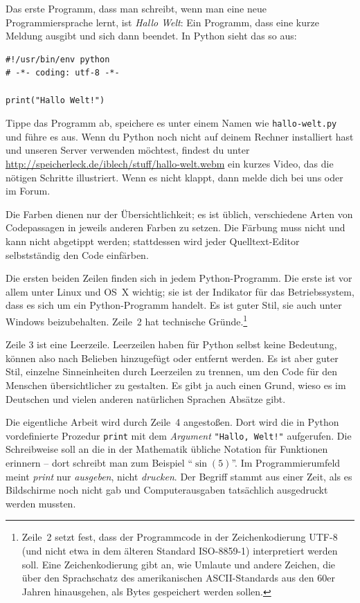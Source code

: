 \documentclass{blatt}
\begin{document}
Das erste Programm, dass man schreibt, wenn man eine neue Programmiersprache
lernt, ist \emph{Hallo Welt}: Ein Programm, dass eine kurze Meldung ausgibt
und sich dann beendet. In Python sieht das so aus:

\begin{verbatim}
#!/usr/bin/env python
# -*- coding: utf-8 -*-

print("Hallo Welt!")
\end{verbatim}

Tippe das Programm ab, speichere es unter
einem Namen wie \texttt{hallo-welt.py} und führe es aus. Wenn du Python noch
nicht auf deinem Rechner installiert hast und unseren Server verwenden
möchtest, findest du unter
\url{http://speicherleck.de/iblech/stuff/hallo-welt.webm} ein kurzes Video, das
die nötigen Schritte illustriert. Wenn es nicht klappt, dann melde dich bei uns
oder im Forum.

Die Farben dienen nur der Übersichtlichkeit; es ist üblich, verschiedene Arten
von Codepassagen in jeweils anderen Farben zu setzen. Die Färbung muss nicht
und kann nicht abgetippt werden; stattdessen wird jeder Quelltext-Editor
selbstständig den Code einfärben.

Die ersten beiden Zeilen finden sich in jedem Python-Programm. Die erste ist
vor allem unter Linux und OS~X wichtig; sie ist der Indikator für das
Betriebssystem, dass es sich um ein Python-Programm handelt. Es ist guter Stil,
sie auch unter Windows beizubehalten. Zeile~2 hat technische
Gründe.\footnote{Zeile~2 setzt fest, dass der Programmcode in der
Zeichenkodierung UTF-8 (und nicht etwa in dem älteren Standard ISO-8859-1)
interpretiert werden soll. Eine Zeichenkodierung gibt an, wie Umlaute und
andere Zeichen, die über den Sprachschatz des amerikanischen ASCII-Standards
aus den 60er Jahren hinausgehen, als Bytes gespeichert werden sollen.}

Zeile 3 ist eine Leerzeile. Leerzeilen haben für Python selbst keine Bedeutung,
können also nach Belieben hinzugefügt oder entfernt werden. Es ist aber guter
Stil, einzelne Sinneinheiten durch Leerzeilen zu trennen, um den Code für den
Menschen übersichtlicher zu gestalten. Es gibt ja auch einen Grund, wieso es im
Deutschen und vielen anderen natürlichen Sprachen Absätze gibt.

Die eigentliche Arbeit wird durch Zeile~4 angestoßen. Dort wird die in Python
vordefinierte Prozedur \texttt{print} mit dem \emph{Argument}
\texttt{"Hallo, Welt!"} aufgerufen. Die Schreibweise soll an die in der Mathematik übliche
Notation für Funktionen erinnern -- dort schreibt man zum Beispiel
"`$\sin(5)$"'. Im Programmierumfeld meint \emph{print} nur \emph{ausgeben},
nicht \emph{drucken}. Der Begriff stammt aus einer Zeit, als es Bildschirme
noch nicht gab und Computerausgaben tatsächlich ausgedruckt werden mussten.
\end{document}
